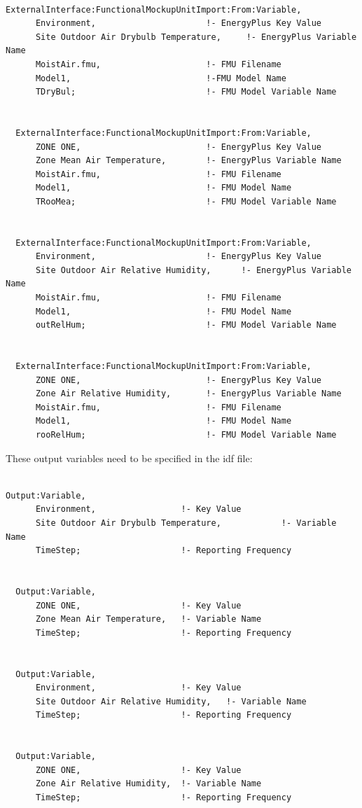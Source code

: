 \begin{lstlisting}

ExternalInterface:FunctionalMockupUnitImport:From:Variable,
      Environment,                      !- EnergyPlus Key Value
      Site Outdoor Air Drybulb Temperature,     !- EnergyPlus Variable Name
      MoistAir.fmu,                     !- FMU Filename
      Model1,                           !-FMU Model Name
      TDryBul;                          !- FMU Model Variable Name


  ExternalInterface:FunctionalMockupUnitImport:From:Variable,
      ZONE ONE,                         !- EnergyPlus Key Value
      Zone Mean Air Temperature,        !- EnergyPlus Variable Name
      MoistAir.fmu,                     !- FMU Filename
      Model1,                           !- FMU Model Name
      TRooMea;                          !- FMU Model Variable Name


  ExternalInterface:FunctionalMockupUnitImport:From:Variable,
      Environment,                      !- EnergyPlus Key Value
      Site Outdoor Air Relative Humidity,      !- EnergyPlus Variable Name
      MoistAir.fmu,                     !- FMU Filename
      Model1,                           !- FMU Model Name
      outRelHum;                        !- FMU Model Variable Name


  ExternalInterface:FunctionalMockupUnitImport:From:Variable,
      ZONE ONE,                         !- EnergyPlus Key Value
      Zone Air Relative Humidity,       !- EnergyPlus Variable Name
      MoistAir.fmu,                     !- FMU Filename
      Model1,                           !- FMU Model Name
      rooRelHum;                        !- FMU Model Variable Name
\end{lstlisting}

These output variables need to be specified in the idf file:

\begin{lstlisting}

Output:Variable,
      Environment,                 !- Key Value
      Site Outdoor Air Drybulb Temperature,            !- Variable Name
      TimeStep;                    !- Reporting Frequency


  Output:Variable,
      ZONE ONE,                    !- Key Value
      Zone Mean Air Temperature,   !- Variable Name
      TimeStep;                    !- Reporting Frequency


  Output:Variable,
      Environment,                 !- Key Value
      Site Outdoor Air Relative Humidity,   !- Variable Name
      TimeStep;                    !- Reporting Frequency


  Output:Variable,
      ZONE ONE,                    !- Key Value
      Zone Air Relative Humidity,  !- Variable Name
      TimeStep;                    !- Reporting Frequency
\end{lstlisting}

